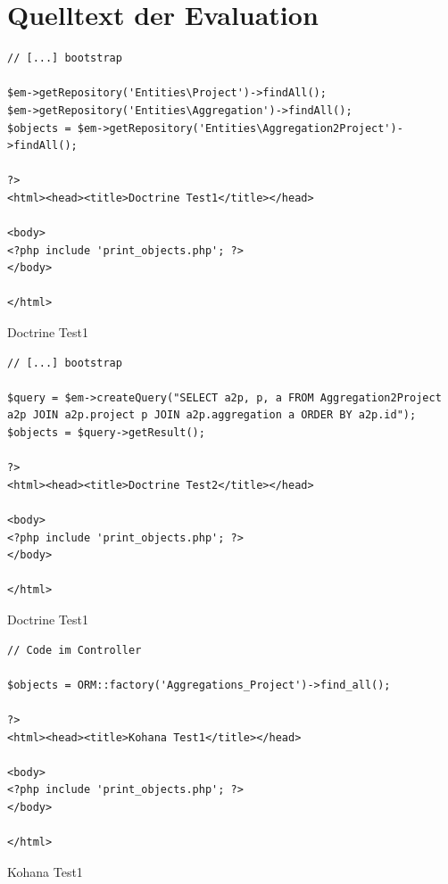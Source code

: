 \chapter{Quelltext der Evaluation} \label{tests-code}


\begin{fcode}
    \lstset{style=php}
    \begin{lstlisting}
// [...] bootstrap

$em->getRepository('Entities\Project')->findAll();
$em->getRepository('Entities\Aggregation')->findAll();
$objects = $em->getRepository('Entities\Aggregation2Project')->findAll();

?>
<html><head><title>Doctrine Test1</title></head>

<body>
<?php include 'print_objects.php'; ?>
</body>

</html>
    \end{lstlisting}
    \caption{Doctrine Test1}
\end{fcode}


\begin{fcode}
    \lstset{style=php}
    \begin{lstlisting}
// [...] bootstrap

$query = $em->createQuery("SELECT a2p, p, a FROM Aggregation2Project a2p JOIN a2p.project p JOIN a2p.aggregation a ORDER BY a2p.id");
$objects = $query->getResult();

?>
<html><head><title>Doctrine Test2</title></head>

<body>
<?php include 'print_objects.php'; ?>
</body>

</html>
    \end{lstlisting}
    \caption{Doctrine Test1}
\end{fcode}

\begin{fcode}
    \lstset{style=php}
    \begin{lstlisting}
// Code im Controller

$objects = ORM::factory('Aggregations_Project')->find_all();

?>
<html><head><title>Kohana Test1</title></head>

<body>
<?php include 'print_objects.php'; ?>
</body>

</html>
    \end{lstlisting}
    \caption{Kohana Test1}
\end{fcode}


